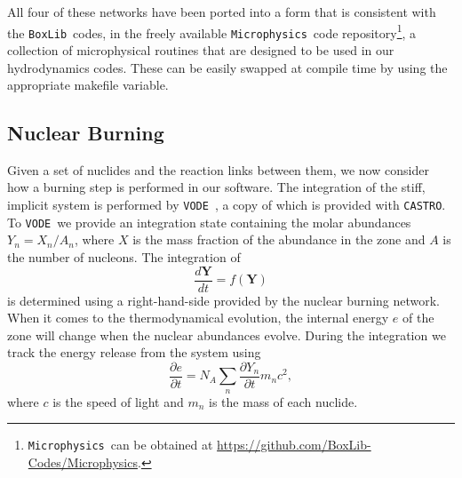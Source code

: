 \documentclass[twocolumn,numberedappendix]{../aastex6}
\newcommand{\boxlib}{\texttt{BoxLib}}
\newcommand{\castro}{\texttt{CASTRO}}
\newcommand{\microphysics}{\texttt{Microphysics}}
\newcommand{\vode}{\texttt{VODE}}
\begin{document}
All four of these networks have been ported into a form that is consistent
with the \boxlib\ codes, in the freely available \microphysics\ code
repository\footnote{\microphysics\ can be obtained at \url{https://github.com/BoxLib-Codes/Microphysics}.},
a collection of microphysical routines that are designed to be used in our
hydrodynamics codes. These can be easily swapped at compile time by using the 
appropriate makefile variable.

\subsection{Nuclear Burning}
\label{sec:burner}

Given a set of nuclides and the reaction links between them, we now consider
how a burning step is performed in our software. The integration of the stiff,
implicit system is performed by \vode\ \citep{vode}, a copy of which is
provided with \castro. To \vode\ we provide an integration state containing
the molar abundances $Y_{n} = X_{n} / A_{n}$, where $X$ is the mass fraction
of the abundance in the zone and $A$ is the number of nucleons. The integration
of
\begin{equation}
  \frac{d\bm{Y}}{dt} = f(\mathbf{Y})
\end{equation}
is determined using a right-hand-side provided by the nuclear burning network.
When it comes to the thermodynamical evolution, the internal energy $e$ of the zone
will change when the nuclear abundances evolve. During the integration we track
the energy release from the system using
\begin{equation}
  \frac{\partial e}{\partial t} = N_A \sum_{n} \frac{\partial Y_{n}}{\partial t} m_{n} c^2,
\end{equation}
where $c$ is the speed of light and $m_n$ is the mass of each nuclide.
\end{document}
